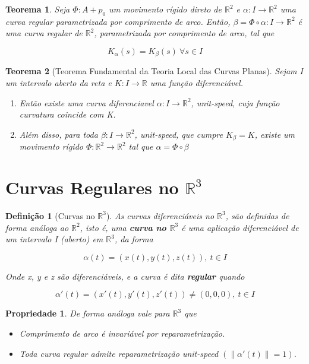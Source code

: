 \documentclass{article}
\newtheorem{prop}{Propriedade}
\newtheorem{theorem}{Teorema}
\newtheorem{definition}{Definição}
\begin{document}
\begin{theorem}
Seja $\Phi: A + p_0$ um movimento rígido direto de $\mathbb{R}^2$ e $\alpha: I \rightarrow \mathbb{R}^2$ uma curva regular parametrizada por comprimento de arco. Então, $\beta = \Phi \circ \alpha: I \rightarrow \mathbb{R}^2$ é uma curva regular de $\mathbb{R}^2$, parametrizada por comprimento de arco, tal que

$$K_\alpha(s) = K_\beta(s) \ \forall s \in I$$
\end{theorem}

\begin{theorem}[Teorema Fundamental da Teoria Local das Curvas Planas]
Sejam I um intervalo aberto da reta e $K: I \rightarrow \mathbb{R}$ uma função diferenciável.

\begin{enumerate}
    \item Então existe uma curva diferenciavel $\alpha: I \rightarrow \mathbb{R}^2$, unit-speed, cuja função curvatura coincide com K.
    
    \item Além disso, para toda $\beta: I \rightarrow \mathbb{R}^2$, unit-speed, que cumpre $K_\beta = K$, existe um movimento rígido $\Phi: \mathbb{R}^2 \rightarrow \mathbb{R}^2$ tal que $\alpha = \Phi \circ \beta$
\end{enumerate}
\end{theorem}

\section*{Curvas Regulares no $\mathbb{R}^3$}
\label{s5}

\begin{definition}[Curvas no $\mathbb{R}^3$]
As curvas diferenciáveis no $\mathbb{R}^3$, são definidas de forma análoga ao $\mathbb{R}^2$, isto é, uma \textbf{curva no $\mathbb{R}^3$} é uma aplicação diferenciável de um intervalo I (aberto) em $\mathbb{R}^3$, da forma

$$\alpha(t) = (x(t), y(t), z(t)),\ t \in I$$

Onde x, y e z são diferenciáveis, e a curva é dita \textbf{regular} quando

$$\alpha'(t) = (x'(t), y'(t), z'(t)) \neq (0, 0, 0),\ t \in I$$
\end{definition}

\begin{prop} De forma análoga vale para $\mathbb{R}^3$ que
\begin{itemize}
    \item Comprimento de arco é invariável por reparametrização.
    
    \item Toda curva regular admite reparametrização \textit{unit-speed} $(\| \alpha'(t) \| = 1)$.
\end{itemize}
\end{prop}
\end{document}
